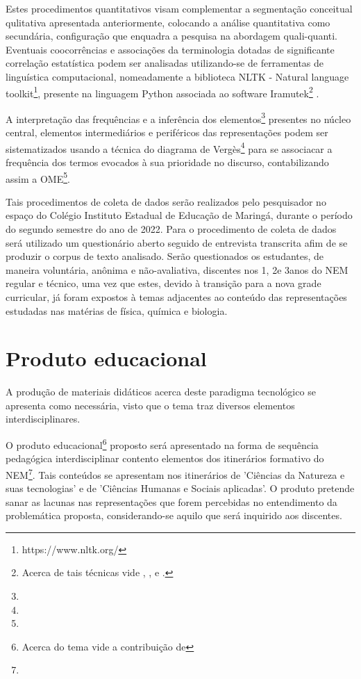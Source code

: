 \documentclass[
  12pt,       %
  openright,      %
  twoside,      %
  a4paper,      %
  english,      %
  french,       %
  spanish,      %
  brazil        %
  ]{abntex2}
\begin{document}
Estes procedimentos quantitativos visam complementar a segmentação conceitual qulitativa apresentada anteriormente, colocando a análise quantitativa como secundária, configuração que enquadra a pesquisa na abordagem quali-quanti. Eventuais coocorrências e associações da terminologia dotadas de significante correlação estatística podem ser analisadas utilizando-se de ferramentas de linguística computacional, nomeadamente a biblioteca NLTK - Natural language toolkit\footnote{https://www.nltk.org/}, presente na linguagem Python associada ao software Iramutek\footnote{Acerca de tais técnicas vide , ,  e .}
.

A interpretação das frequências e a inferência dos elementos\footnote{} presentes no núcleo central, elementos intermediários e periféricos das representações podem ser sistematizados usando a técnica do diagrama de Vergès\footnote{} para se associacar a frequência dos termos evocados à sua prioridade no discurso, contabilizando assim a OME\footnote{}.

Tais procedimentos de coleta de dados serão realizados pelo pesquisador no espaço do Colégio Instituto Estadual de Educação de Maringá, durante o período do segundo semestre do ano de 2022. Para o procedimento de coleta de dados será utilizado um questionário aberto seguido de entrevista transcrita afim de se produzir o corpus de texto analisado. Serão questionados os estudantes, de maneira voluntária, anônima e não-avaliativa, discentes nos 1\textordmasculine, 2\textordmasculine e 3\textordmasculine anos do NEM regular e técnico, uma vez que estes, devido à transição para a nova grade curricular, já foram expostos à temas adjacentes ao conteúdo das representações estudadas nas matérias de física, química e biologia. 



\chapter{Produto educacional}

A produção de materiais didáticos acerca deste paradigma tecnológico se apresenta como necessária, visto que o tema traz diversos elementos interdisciplinares.

O produto educacional\footnote{Acerca do tema vide a contribuição de } proposto será apresentado na forma de sequência pedagógica interdisciplinar contento elementos dos itinerários formativo do NEM\footnote{}. Tais conteúdos se apresentam nos itinerários de 'Ciências da Natureza e suas tecnologias' e de 'Ciências Humanas e Sociais aplicadas'. O produto pretende sanar as lacunas nas representações que forem percebidas no entendimento da problemática proposta, considerando-se aquilo que será inquirido aos discentes.
\end{document}
